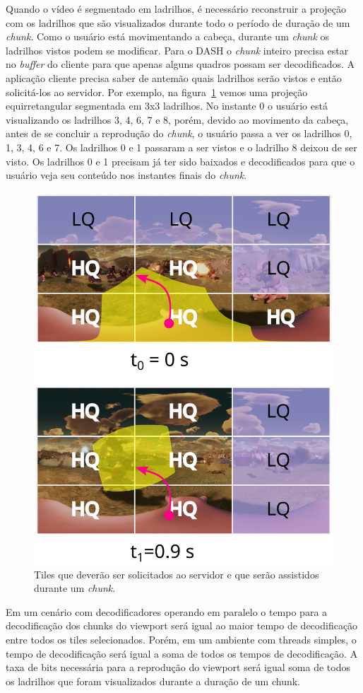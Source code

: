{Quando o vídeo é segmentado em ladrilhos, é necessário reconstruir a projeção com os ladrilhos que são visualizados durante todo o período de duração de um \textit{chunk}. Como o usuário está movimentando a cabeça, durante um \textit{chunk} os ladrilhos vistos podem se modificar. Para o DASH o \textit{chunk} inteiro precisa estar no \textit{buffer} do cliente para que apenas alguns quadros possam ser decodificados. A aplicação cliente precisa saber de antemão quais ladrilhos serão vistos e então solicitá-los ao servidor. Por exemplo, na figura~\ref{fig:selectTiles} vemos uma projeção equirretangular segmentada em 3x3 ladrilhos. No instante 0 o usuário está visualizando os ladrilhos 3, 4, 6, 7 e 8, porém, devido ao movimento da cabeça, antes de se concluir a reprodução do \textit{chunk}, o usuário passa a ver os ladrilhos 0, 1, 3, 4, 6 e 7. Os ladrilhos 0 e 1 passaram a ser vistos e o ladrilho 8 deixou de ser visto. Os ladrilhos 0 e 1 precisam já ter sido baixados e decodificados para que o usuário veja seu conteúdo nos instantes finais do \textit{chunk}.

\begin{figure}[h]
        \centering
        \includegraphics[width=0.5\linewidth]{fig/Streaming of Tiles 2.png}
        \caption{Tiles que deverão ser solicitados ao servidor e que serão assistidos durante um \textit{chunk}.}
        \label{fig:selectTiles}
\end{figure}

Em um cenário com decodificadores operando em paralelo o tempo para a decodificação dos chunks do viewport será igual ao maior tempo de decodificação entre todos os tiles selecionados. Porém, em um ambiente com threads simples, o tempo de decodificação será igual a soma de todos os tempos de decodificação. A taxa de bits necessária para a reprodução do viewport será igual soma de todos os ladrilhos que foram visualizados durante a duração de um chunk.

}
